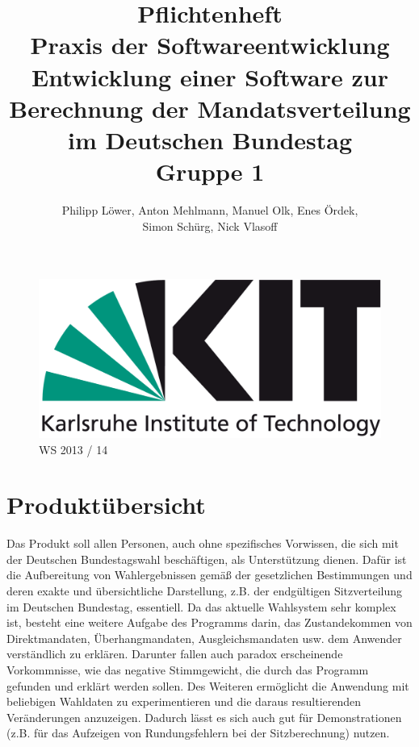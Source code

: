 \documentclass[10pt,a4paper]{article}
\title{\Huge Pflichtenheft\\[1cm] {\bfseries Praxis der Softwareentwicklung}\\[2cm] Entwicklung einer Software zur Berechnung der Mandatsverteilung im Deutschen Bundestag\\[1cm]Gruppe 1}
\author{Philipp Löwer, Anton Mehlmann, Manuel Olk, Enes Ördek, \\Simon Schürg, Nick Vlasoff}
\date{}
\begin{document}
\maketitle
\thispagestyle{empty}

\begin{figure}[h]

\centering
		
		\includegraphics[scale=0.6]{KIT-Logo.png}\\
		\Huge WS 2013 / 14
\end{figure}

\newpage
\begin{onehalfspace}
\tableofcontents
\end{onehalfspace}
\newpage 

\section{Produktübersicht}
Das Produkt soll allen Personen, auch ohne spezifisches Vorwissen, die sich mit der Deutschen Bundestagswahl beschäftigen, als Unterstützung dienen.\newline
Dafür ist die Aufbereitung von Wahlergebnissen gemäß der gesetzlichen Bestimmungen und deren exakte und übersichtliche Darstellung, z.B. der endgültigen Sitzverteilung im Deutschen Bundestag, essentiell.
Da das aktuelle Wahlsystem sehr komplex ist, besteht eine weitere Aufgabe des Programms darin, das Zustandekommen von Direktmandaten, Überhangmandaten, Ausgleichsmandaten usw. dem Anwender verständlich zu erklären.
Darunter fallen auch paradox erscheinende Vorkommnisse, wie das negative Stimmgewicht, die durch das Programm gefunden und erklärt werden sollen. \newline
Des Weiteren ermöglicht die Anwendung mit beliebigen Wahldaten zu experimentieren und die daraus resultierenden Veränderungen anzuzeigen. Dadurch lässt es sich auch gut für Demonstrationen (z.B. für das Aufzeigen von Rundungsfehlern bei der Sitzberechnung) nutzen.
\end{document}
